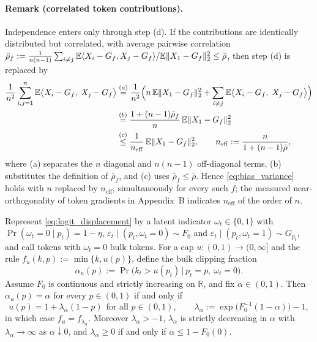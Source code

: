 \paragraph{Remark (correlated token contributions).}
Independence enters only through step (d). If the contributions are
identically distributed but correlated, with average pairwise correlation
$\bar\rho_f:=\frac{1}{n(n-1)}\sum_{i\neq j}\mathbb{E}\langle X_i-G_f,X_j-G_f\rangle
/\mathbb{E}\|X_1-G_f\|_2^2\le\bar\rho$, then step (d) is replaced by
\begin{align*}
\frac{1}{n^2}\sum_{i,j=1}^{n}\mathbb{E}\big\langle X_i-G_f,\;X_j-G_f\big\rangle
&\overset{(a)}{=} \frac{1}{n^2}\Big(n\,\mathbb{E}\|X_1-G_f\|_2^2
+\sum_{i\neq j}\mathbb{E}\big\langle X_i-G_f,\;X_j-G_f\big\rangle\Big)\\
&\overset{(b)}{=} \frac{1+(n-1)\bar\rho_f}{n}\,\mathbb{E}\|X_1-G_f\|_2^2\\
&\overset{(c)}{\le} \frac{1}{n_{\mathrm{eff}}}\,\mathbb{E}\|X_1-G_f\|_2^2,
\qquad n_{\mathrm{eff}}:=\frac{n}{1+(n-1)\bar\rho},
\end{align*}
where (a) separates the $n$ diagonal and $n(n-1)$ off-diagonal terms, (b)
substitutes the definition of $\bar\rho_f$, and (c) uses $\bar\rho_f\le\bar\rho$.
Hence \eqref{eq:bias_variance} holds with $n$ replaced by $n_{\mathrm{eff}}$,
simultaneously for every such $f$; the measured near-orthogonality of token
gradients in Appendix~B %
indicates $n_{\mathrm{eff}}$ of the order of $n$.

\begin{lemma}
\label{lem:calibration}
Represent \eqref{eq:logit_displacement} by a latent indicator
$\omega_t\in\{0,1\}$ with $\Pr(\omega_t=0\mid p_t)=1-\eta$,
$\varepsilon_t\mid(p_t,\omega_t=0)\sim F_0$ and
$\varepsilon_t\mid(p_t,\omega_t=1)\sim G_{p_t}$, and call tokens with
$\omega_t=0$ bulk tokens. For a cap $u:(0,1)\to(0,\infty]$ and the rule
$f_u(k,p):=\min\{k,u(p)\}$, define the bulk clipping fraction
\begin{equation}
\alpha_u(p):=\Pr\big(k_t>u(p_t)\,\big|\,p_t=p,\ \omega_t=0\big).
\label{eq:bulk_fraction}
\end{equation}
Assume $F_0$ is continuous and strictly increasing on $\mathbb R$, and fix
$\alpha\in(0,1)$. Then $\alpha_u(p)=\alpha$ for every $p\in(0,1)$ if and only if
\begin{equation}
u(p)=1+\lambda_\alpha(1-p)\ \ \text{for all }p\in(0,1),
\qquad
\lambda_\alpha:=\exp\!\big(F_0^{-1}(1-\alpha)\big)-1,
\label{eq:calibrated_cap}
\end{equation}
in which case $f_u=f_{\lambda_\alpha}$. Moreover $\lambda_\alpha>-1$,
$\lambda_\alpha$ is strictly decreasing in $\alpha$ with
$\lambda_\alpha\to\infty$ as $\alpha\downarrow0$, and $\lambda_\alpha\ge0$ if
and only if $\alpha\le1-F_0(0)$.
\end{lemma}

